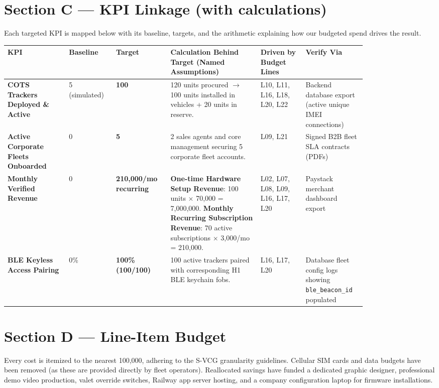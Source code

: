 \documentclass[11pt,a4paper]{article}
\begin{document}
\vspace{0.3cm}

\section{Section C --- KPI Linkage (with calculations)}
Each targeted KPI is mapped below with its baseline, targets, and the arithmetic explaining how our budgeted spend drives the result.

\renewcommand{\arraystretch}{1.3}
{\small
\begin{longtable}{p{0.15\linewidth} p{0.10\linewidth} p{0.12\linewidth} p{0.22\linewidth} p{0.11\linewidth} p{0.13\linewidth}}
    \toprule
    \textbf{KPI} & \textbf{Baseline} & \textbf{Target} & \textbf{Calculation Behind Target (Named Assumptions)} & \textbf{Driven by Budget Lines} & \textbf{Verify Via} \\
    \midrule
    \textbf{COTS Trackers Deployed \& Active} & 5 (simulated) & \textbf{100} & 120 units procured $\rightarrow$ 100 units installed in vehicles + 20 units in reserve. & L10, L11, L16, L18, L20, L22 & Backend database export (active unique IMEI connections) \\
    \midrule
    \textbf{Active Corporate Fleets Onboarded} & 0 & \textbf{5} & 2 sales agents and core management securing 5 corporate fleet accounts. & L09, L21 & Signed B2B fleet SLA contracts (PDFs) \\
    \midrule
    \textbf{Monthly Verified Revenue} & \text{₦}0 & \textbf{\text{₦}210,000/mo recurring} & \textbf{One-time Hardware Setup Revenue}: 100 units $\times$ \text{₦}70,000 = \text{₦}7,000,000. \textbf{Monthly Recurring Subscription Revenue}: 70 active subscriptions $\times$ \text{₦}3,000/mo = \text{₦}210,000. & L02, L07, L08, L09, L16, L17, L20 & Paystack merchant dashboard export \\
    \midrule
    \textbf{BLE Keyless Access Pairing} & 0\% & \textbf{100\% (100/100)} & 100 active trackers paired with corresponding H1 BLE keychain fobs. & L16, L17, L20 & Database fleet config logs showing \texttt{ble\_}\-\texttt{beacon\_}\-\texttt{id} populated \\
    \bottomrule
\end{longtable}
}

\vspace{0.3cm}

\section{Section D --- Line-Item Budget}
Every cost is itemized to the nearest 100,000, adhering to the S-VCG granularity guidelines. Cellular SIM cards and data budgets have been removed (as these are provided directly by fleet operators). Reallocated savings have funded a dedicated graphic designer, professional demo video production, valet override switches, Railway app server hosting, and a company configuration laptop for firmware installations.
\end{document}

